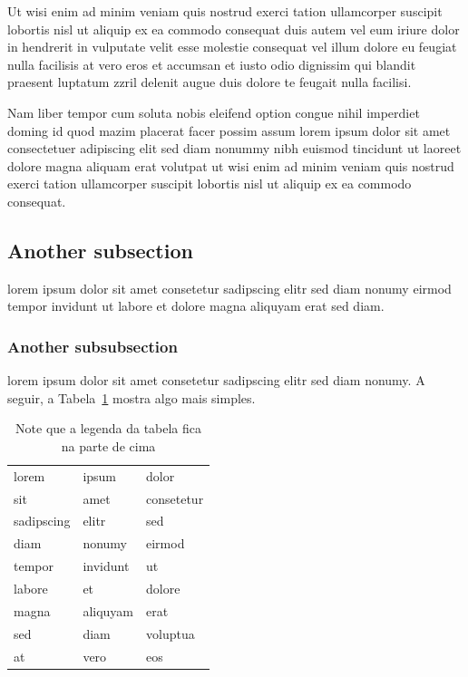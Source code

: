 Ut wisi enim ad minim veniam quis nostrud exerci tation
ullamcorper suscipit lobortis nisl ut aliquip ex ea commodo
consequat duis autem vel eum iriure dolor in hendrerit in
vulputate velit esse molestie consequat vel illum dolore eu
feugiat nulla facilisis at vero eros et accumsan et iusto odio
dignissim qui blandit praesent luptatum zzril delenit augue duis
dolore te feugait nulla facilisi.

Nam liber tempor cum soluta nobis eleifend option congue nihil
imperdiet doming id quod mazim placerat facer possim assum lorem
ipsum dolor sit amet consectetuer adipiscing elit sed diam nonummy
nibh euismod tincidunt ut laoreet dolore magna aliquam erat
volutpat ut wisi enim ad minim veniam quis nostrud exerci tation
ullamcorper suscipit lobortis nisl ut aliquip ex ea commodo
consequat.

\subsection*{Another subsection}

lorem ipsum dolor sit amet consetetur sadipscing elitr sed diam
nonumy eirmod tempor invidunt ut labore et dolore magna aliquyam
erat sed diam.~\cite{COFFMANPACKING98}

\subsubsection*{Another subsubsection}

lorem ipsum dolor sit amet consetetur sadipscing elitr sed diam
nonumy. A seguir, a Tabela~\ref{tab:tab2} mostra algo mais
simples.

\begin{table}
\begin{center}%
\caption{\label{tab:tab2}Note que a legenda da tabela fica na parte de cima}%
\begin{tabular*}{.7\linewidth}{@{\extracolsep{\fill}}lll}%
\noalign{\smallskip}
\hline
lorem & ipsum & dolor \tabularnewline
sit & amet & consetetur \tabularnewline
sadipscing & elitr & sed \tabularnewline
diam & nonumy & eirmod \tabularnewline
tempor & invidunt & ut \tabularnewline
labore & et & dolore \tabularnewline
magna & aliquyam & erat \tabularnewline
sed & diam & voluptua \tabularnewline
at & vero & eos \tabularnewline
\end{tabular*}
\end{center}
\end{table}

